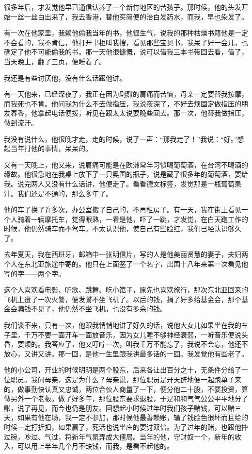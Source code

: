 \par 很多年后，才发觉他早已通信认养了一个新竹地区的苦孩子。那时候，他的头发开始一丝一丝白出来了，我去香港，替他买简便的治白发药水，而我，早也染发了。
\par 有一次在他家里，我赖他偷我当年的书，他很生气，说我的那种枯燥书籍他是一定不会看的，我不肯信，他打开书柜叫我搜，看见那些宝贝书，我呆了好一会儿，也确定了他不可能偷我的书。那一天他很慷慨，说可以借我三本书带回去看，借了，当天晚上，翻了三页，便睡着了。
\par 我还是有些讨厌他，没有什么话跟他讲。
\par 有一天他来，已经深夜了，我正在因为剧烈的肩痛而苦恼，母亲一定要替我按摩，而我死也不肯。他问我为什么不去做指压，我说夜深了，不好去烦固定做指压的朋友春香，他拿起电话便拨，听见在跟太太说要晚些回去。那一次，他替我做指压，做到流汗。
\par 我没有说什么，他很晚才走，走的时候，说了一声：“那我走了！”我说：“好。”想起当年打他的事情，呆呆的。
\par 又有一天晚上，他又来，说肩痛可能是在欧洲常年习惯喝葡萄酒，在台湾不喝酒的缘故。他很急地在我桌上放下了一只奥国的瓶子，说是藏了很多年的葡萄酒，要给我。说完两人又没有什么话讲，他便走了。看看德文标签，发觉那是一瓶葡萄果汁。我们还是不通的，那么多年了。
\par 他的车子换了许多次，办公室搬了自己的，不再租房子。有一天，我在街上看见一个人骑着一辆摩托车，觉得眼熟，一看是他，吓了一跳，才发觉，在白天跑工作的时候，他仍然骑车而不驾车。不太认识他，使自己有些脸红，我们已经认识够久了。
\par 去年夏天，我在西班牙，邮箱中一张明信片，写的人是他美丽贤慧的妻子，夫妇两个人在东北亚旅途中寄的。他只在上面签了一个名字，出国十八年来第一次看见他写的字——两个字。
\par 这个人喜欢看电影、听歌、跳舞、吃小馆子，原先也喜欢旅行，那次东北亚回来的飞机上遭了一次火警，便发誓不坐飞机了。以后的钱，捐了好多给基金会，那个基金会骗钱不见了，他仍然不坐飞机，也没有多余的钱。
\par 我们谈不来，只有一次，他跟我悄悄地讲了好久的话，说他大女儿如果坐在我的车子里，千万不要一面开车一面放音乐，因为女儿睡不够神经衰弱，一听音乐便说头昏，要烦的。我答应了，他又叮咛一次，叫我千万不能忘了，我说不会忘，他还不放心，又讲又讲。那一回，是他一生里跟我讲最多话的一回。我发觉他有些老了。
\par 他的小公司，开业的时候明明是两个股东，后来各让出百分之十，无条件分给了一位职员。我问母亲，这是为什么？母亲说，那位职员是开天辟地便一起跑单子来的，做事勤快认真又忠诚，两位合伙人商量了一下，便分他二十股，不要投资，算做另外一个老板。做了好多年，那位股东要求退股，于是和和气气公公平平地分了账，说了再见，而今也仍是朋友。回想起小时候过年时我们孩子赌钱，可以赌三天，如果有他在场，我一定不参加，那时候他最善赖账，输了钱脸色很坏而且给的时候一定打折扣，如果赢了，死活也说坐庄的要讨双倍。为了过年的赌，也跟他摔过碗，吵过、气过，将新年气氛弄成大僵局。当年的他，守财奴一个，新年的收入，可以用上半年几个月不缺钱，而我，是看不起他的。
